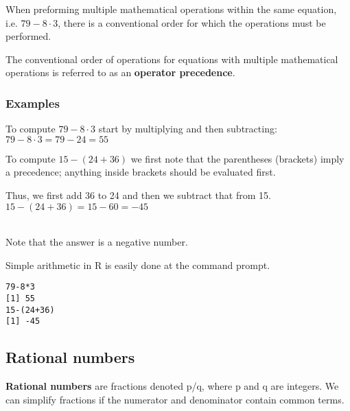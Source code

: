 \documentclass[12pt,a4paper]{article}
\theoremstyle{regla}
\theoremstyle{remark}
\theoremstyle{definition}
\theoremstyle{nonumberbreak}
\begin{document}
When preforming multiple mathematical operations within the same equation, i.e. $79 - 8\cdot 3$, there is a conventional order for which the operations must be performed.  

\begin{defn}
The conventional order of operations for equations with multiple mathematical operations is referred to as an \textbf{operator precedence}.
\end {defn}


\subsubsection{Examples}
\begin{xmpl}
To compute $79 - 8\cdot 3$ start by multiplying and then subtracting:\\
$79 - 8\cdot 3 = 79-24 = 55$
\end{xmpl} 
\begin{xmpl} 
To compute $15 - (24 + 36)$ we first note that the parentheses (brackets) imply a precedence; anything inside brackets should be evaluated first.

Thus, we first add 36 to 24 and then we subtract that from 15.\\ 
$15 - (24+36) = 15 - 60 = - 45$\\\

Note that the answer is a negative number. 
\end{xmpl} 
\begin{xmpl} 
Simple arithmetic in R is easily done at the command prompt.
\begin{verbatim}
79-8*3
[1] 55
15-(24+36)
[1] -45
\end{verbatim}
\end{xmpl} 


\subsection{Rational numbers}
\begin{fbox}
\begin{minipage}{0.97\textwidth}
{\bf Rational numbers} are fractions denoted p/q, where p and q are integers. We can simplify fractions if the numerator and denominator contain common terms.
\end{minipage}
\end{fbox}
\end{document}
